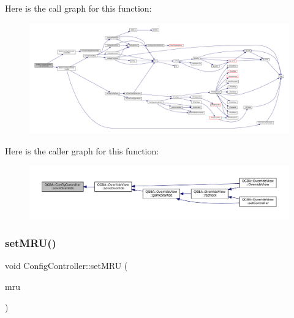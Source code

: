 Here is the call graph for this function\+:
\nopagebreak
\begin{figure}[H]
\begin{center}
\leavevmode
\includegraphics[width=350pt]{class_q_g_b_a_1_1_config_controller_a3b27eca39ad08c332c65ee00e9aa7038_cgraph}
\end{center}
\end{figure}
Here is the caller graph for this function\+:
\nopagebreak
\begin{figure}[H]
\begin{center}
\leavevmode
\includegraphics[width=350pt]{class_q_g_b_a_1_1_config_controller_a3b27eca39ad08c332c65ee00e9aa7038_icgraph}
\end{center}
\end{figure}
\mbox{\label{class_q_g_b_a_1_1_config_controller_ae8779e0933a56b6b08cf368660432ac1}} 
\subsubsection{\texorpdfstring{set\+M\+R\+U()}{setMRU()}}
{\footnotesize\ttfamily void Config\+Controller\+::set\+M\+RU (\begin{DoxyParamCaption}\item[{const Q\+List$<$ Q\+String $>$ \&}]{mru }\end{DoxyParamCaption})}

